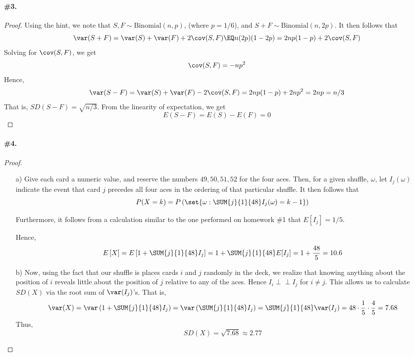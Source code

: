 \documentclass[12pt,titlepage]{article}
\newcommand{\orth}{\perp\!\!\!\perp}
\begin{document}
\paragraph{\#3.}
\begin{proof}
Using the hint, we note that $S,F \sim \text{Binomial}(n,p)$, (where $p=1/6$), and $S+F \sim \text{Binomial}(n,2p)$. It then follows that 
\[
\var(S+F) = \var(S) + \var(F) + 2\cov(S,F) \EQ n(2p)(1-2p) = 2np(1-p)  + 2 \cov(S,F)
\]
Solving for $\cov(S,F)$, we get
\[
\cov(S,F) = -np^2
\]
Hence,
\[
\var(S-F) = \var(S) + \var(F) -2\cov(S,F) = 2np(1-p) + 2np^2 = 2np = n/3
\]
That is, $SD(S-F) = \sqrt{n/3}$. From the linearity of expectation, we get 
\[
E(S-F) = E(S) - E(F) = 0
\]
\end{proof}

\paragraph{\#4.}
\begin{proof}
\begin{enumerate}
\item[a)] Give each card a numeric value, and reserve the numbers $49,50,51,52$ for the four aces. Then, for a given shuffle, $\omega$, let $I_j(\omega)$ indicate the event that card $j$ precedes all four aces in the ordering of that particular shuffle. It then follows that
\[
P( X = k ) = P\left(\set{\omega : \SUM{j}{1}{48} I_{j}(\omega) = k-1}\right)
\]

Furthermore, it follows from a calculation similar to the one performed on homework \#1 that $E[I_j] = 1/5$. 

Hence,
\[
E\left[X\right] = E\left[ 1+ \SUM{j}{1}{48} I_j \right] = 1+\SUM{j}{1}{48} E[I_j] = 1+ \frac{48}{5}=10.6
\]
\item[b)]
Now, using the fact that our shuffle is places cards $i$ and $j$ randomly in the deck, we realize that knowing anything about the position of $i$ reveals little about the position of $j$ relative to any of the aces. Hence $I_i \orth I_j$ for $i \neq j$. This allows us to calculate $SD(X)$ via the root sum of $\var(I_j)$'s. That is, 
\[
\var(X) = \var\left(1+\SUM{j}{1}{48}I_j\right) = \var\left(\SUM{j}{1}{48}I_j\right) = \SUM{j}{1}{48} \var(I_j) = 48\cdot \frac{1}{5}\cdot\frac{4}{5} = 7.68
\]
Thus, 
\[
SD(X) = \sqrt{7.68} \approx 2.77
\]
\end{enumerate}
\end{proof}
\end{document}
